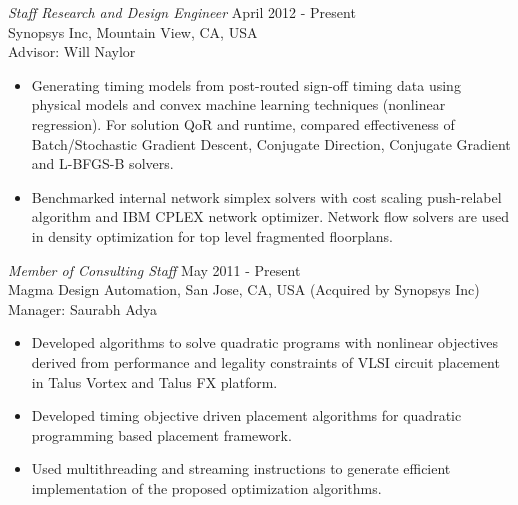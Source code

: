 \documentclass[margin]{res}
\begin{document}
\begin{resume}
{\sl Staff Research and Design Engineer} \hfill April 2012 - Present\\
Synopsys Inc, Mountain View, CA, USA\\
Advisor: Will Naylor
\begin{itemize} \itemsep -2pt
\item Generating timing models from post-routed sign-off timing data using
  physical models and convex machine learning techniques 
  (nonlinear regression). For solution QoR and runtime, compared
  effectiveness of Batch/Stochastic Gradient Descent, Conjugate Direction, 
  Conjugate Gradient and L-BFGS-B solvers.
\item Benchmarked internal network simplex solvers with cost scaling
  push-relabel algorithm and IBM CPLEX network optimizer. Network flow 
  solvers are used in density optimization for top level fragmented floorplans.
\end{itemize}

{\sl Member of Consulting Staff} \hfill May 2011 - Present\\
Magma Design Automation, San Jose, CA, USA (Acquired by Synopsys Inc)\\
Manager: Saurabh Adya
\begin{itemize} \itemsep -2pt
\item Developed algorithms to solve quadratic programs with nonlinear
  objectives derived from performance and legality constraints of VLSI circuit
  placement in Talus Vortex and Talus FX platform.
\item Developed timing objective driven placement algorithms for quadratic 
  programming based placement framework.
\item Used multithreading and streaming instructions to generate efficient
  implementation of the proposed optimization algorithms.
\end{itemize}


\end{resume}
\end{document}
